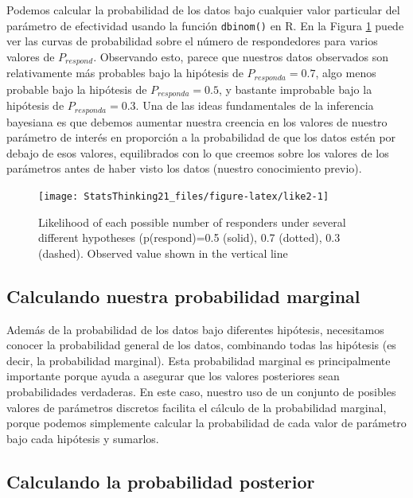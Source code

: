\documentclass[
  12pt,
]{book}
\theoremstyle{definition}
\theoremstyle{definition}
\theoremstyle{definition}
\theoremstyle{remark}
\begin{document}
Podemos calcular la probabilidad de los datos bajo cualquier valor particular del parámetro de efectividad usando la función \texttt{dbinom()} en R. En la Figura \ref{fig:like2} puede ver las curvas de probabilidad sobre el número de respondedores para varios valores de \(P_ {respond}\). Observando esto, parece que nuestros datos observados son relativamente más probables bajo la hipótesis de \(P_ {responda} = 0.7\), algo menos probable bajo la hipótesis de \(P_ {responda} = 0.5\), y bastante improbable bajo la hipótesis de \(P_ {responda} = 0.3\). Una de las ideas fundamentales de la inferencia bayesiana es que debemos aumentar nuestra creencia en los valores de nuestro parámetro de interés en proporción a la probabilidad de que los datos estén por debajo de esos valores, equilibrados con lo que creemos sobre los valores de los parámetros antes de haber visto los datos (nuestro conocimiento previo).

\begin{figure}
\texttt{[image: StatsThinking21\_files/figure-latex/like2-1]} \caption{Likelihood of each possible number of responders under several different hypotheses (p(respond)=0.5 (solid), 0.7 (dotted), 0.3 (dashed).  Observed value shown in the vertical line}\label{fig:like2}
\end{figure}

\hypertarget{calculando-nuestra-probabilidad-marginal}{%
\subsection{Calculando nuestra probabilidad marginal}\label{calculando-nuestra-probabilidad-marginal}}

Además de la probabilidad de los datos bajo diferentes hipótesis, necesitamos conocer la probabilidad general de los datos, combinando todas las hipótesis (es decir, la probabilidad marginal). Esta probabilidad marginal es principalmente importante porque ayuda a asegurar que los valores posteriores sean probabilidades verdaderas. En este caso, nuestro uso de un conjunto de posibles valores de parámetros discretos facilita el cálculo de la probabilidad marginal, porque podemos simplemente calcular la probabilidad de cada valor de parámetro bajo cada hipótesis y sumarlos.

\hypertarget{calculando-la-probabilidad-posterior}{%
\subsection{Calculando la probabilidad posterior}\label{calculando-la-probabilidad-posterior}}
\end{document}
